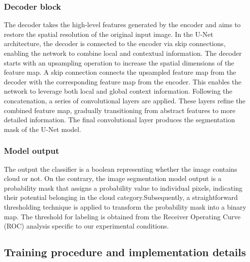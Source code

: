 \documentclass[amt, article]{copernicus}
\begin{document}
\subsubsection{Decoder block}

The decoder takes the high-level features generated by the encoder and aims to restore the spatial resolution of the original input image. In the U-Net architecture, the decoder is connected to the encoder via skip connections, enabling the network to combine local and contextual information. The decoder starts with an upsampling operation to increase the spatial dimensions of the feature map. A skip connection connects the upsampled feature map from the decoder with the corresponding feature map from the encoder. This enables the network to leverage both local and global context information. Following the concatenation, a series of convolutional layers are applied. These layers refine the combined feature map, gradually transitioning from abstract features to more detailed information. The final convolutional layer produces the segmentation mask of the U-Net model.

\subsubsection{Model output}

The output the classifier is a boolean representing whether the image contains cloud or not. On the contrary, the image segmentation model output is a probability mask that assigns a probability value to individual pixels, indicating their potential belonging in the cloud category.Subsequently, a straightforward thresholding technique is applied to transform the probability mask into a binary map. The threshold for labeling is obtained from the Receiver Operating Curve (ROC) analysis specific to our experimental conditions.

\subsection{Training procedure and implementation details}
\end{document}

